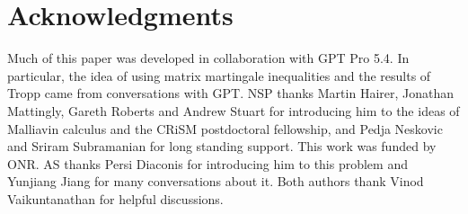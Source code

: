 \documentclass[11pt, reqno]{amsart}
\numberwithin{equation}{section}
\theoremstyle{remark}
\newcommand{\1}{\mathbf{1}}
\begin{document}
\section*{Acknowledgments}

Much of this paper was developed in collaboration with GPT Pro 5.4. In particular, the idea of using matrix martingale inequalities and the results of Tropp came from conversations with GPT. NSP thanks Martin Hairer, Jonathan Mattingly, Gareth Roberts and Andrew Stuart for introducing him to the ideas of Malliavin calculus and the CRiSM postdoctoral fellowship, and Pedja Neskovic and Sriram Subramanian for long standing support. This work was funded by ONR. AS thanks Persi Diaconis for introducing him to this problem and Yunjiang Jiang for many conversations about it. Both authors thank Vinod Vaikuntanathan for helpful discussions.



\end{document}
